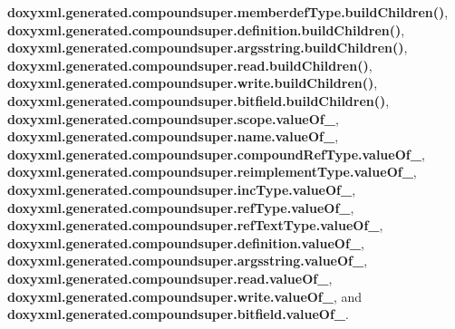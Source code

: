 {\bf doxyxml.\+generated.\+compoundsuper.\+memberdef\+Type.\+build\+Children()}, {\bf doxyxml.\+generated.\+compoundsuper.\+definition.\+build\+Children()}, {\bf doxyxml.\+generated.\+compoundsuper.\+argsstring.\+build\+Children()}, {\bf doxyxml.\+generated.\+compoundsuper.\+read.\+build\+Children()}, {\bf doxyxml.\+generated.\+compoundsuper.\+write.\+build\+Children()}, {\bf doxyxml.\+generated.\+compoundsuper.\+bitfield.\+build\+Children()}, {\bf doxyxml.\+generated.\+compoundsuper.\+scope.\+value\+Of\+\_\+}, {\bf doxyxml.\+generated.\+compoundsuper.\+name.\+value\+Of\+\_\+}, {\bf doxyxml.\+generated.\+compoundsuper.\+compound\+Ref\+Type.\+value\+Of\+\_\+}, {\bf doxyxml.\+generated.\+compoundsuper.\+reimplement\+Type.\+value\+Of\+\_\+}, {\bf doxyxml.\+generated.\+compoundsuper.\+inc\+Type.\+value\+Of\+\_\+}, {\bf doxyxml.\+generated.\+compoundsuper.\+ref\+Type.\+value\+Of\+\_\+}, {\bf doxyxml.\+generated.\+compoundsuper.\+ref\+Text\+Type.\+value\+Of\+\_\+}, {\bf doxyxml.\+generated.\+compoundsuper.\+definition.\+value\+Of\+\_\+}, {\bf doxyxml.\+generated.\+compoundsuper.\+argsstring.\+value\+Of\+\_\+}, {\bf doxyxml.\+generated.\+compoundsuper.\+read.\+value\+Of\+\_\+}, {\bf doxyxml.\+generated.\+compoundsuper.\+write.\+value\+Of\+\_\+}, and {\bf doxyxml.\+generated.\+compoundsuper.\+bitfield.\+value\+Of\+\_\+}.



